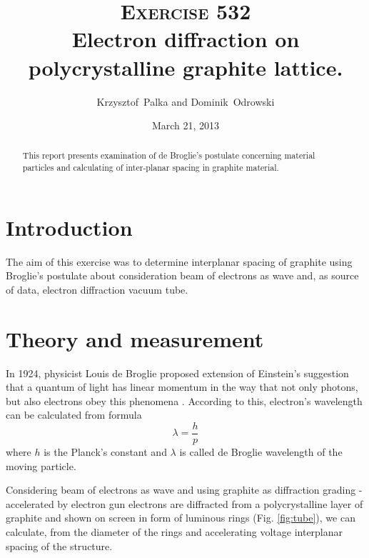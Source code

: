 \documentclass[a4paper,12pt]{article}
\author{Krzysztof~Palka and Dominik~Odrowski}
\date{March 21, 2013}
\title{\textsc{Exercise} 532 \\ Electron diffraction on polycrystalline graphite lattice.}
\begin{document}
\maketitle

\begin{abstract}
This report presents examination of de Broglie's postulate concerning material particles and calculating of inter-planar spacing in graphite material. 
\end{abstract}

\section{Introduction}
The aim of this exercise was to determine interplanar spacing of graphite using Broglie's postulate about consideration beam of electrons as wave and, as source of data, electron diffraction vacuum tube. 

\section{Theory and measurement}
In 1924, physicist Louis de Broglie proposed extension of Einstein's suggestion that a quantum of light has linear momentum in the way that not only photons, but also electrons obey this phenomena \cite{HRW}.
According to this, electron's wavelength can be calculated from formula
\begin{equation}
    \lambda = \frac{h}{p} \label{eq:bwl}
\end{equation}
where $h$ is the Planck's constant and $\lambda$ is called de Broglie wavelength of the moving particle.

Considering beam of electrons as wave and using graphite as diffraction grading - accelerated by electron gun electrons are diffracted from a polycrystalline layer of graphite and shown on screen in form of luminous rings (Fig. \ref{fig:tube}), we can calculate, from the diameter of the rings and accelerating voltage interplanar spacing of the structure.
\end{document}
